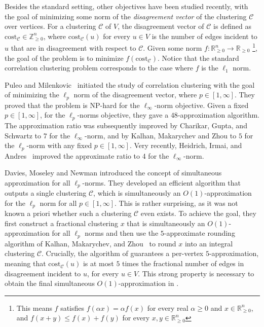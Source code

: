 \documentclass[11pt]{article}
\newcommand{\R}{\mathbb{R}}
\newcommand{\cost}{\mathrm{cost}}
\newcommand{\calC}{{\mathcal{C}}}
\begin{document}
\begin{CJK*}{UTF8}{gbsn}
Besides the standard setting, other objectives have been studied recently, with the goal of minimizing some norm of the \textit{disagreement vector} of the clustering $\calC$ over vertices. For a clustering $\mathcal{C}$ of $V$, the disagreement vector of $\calC$ is defined as $\cost_{\calC} \in \mathbb{Z}_{\ge 0}^{n}$, where $\cost_{\calC}(u)$ for every $u \in V$ is the number of edges incident to $u$ that are in disagreement with respect to $\mathcal{C}$. Given some norm $f:\R_{\geq 0}^n \to \R_{\geq 0}$ \footnote{This means $f$ satisfies $f(\alpha x) = \alpha f(x)$ for every real $\alpha \geq 0$ and $x \in \R_{\geq 0}^n$, and $f(x + y) \leq f(x) + f(y)$ for every $x, y \in \R_{\geq 0}^n$}, the goal of the problem is to minimize $f(\cost_{\calC})$. Notice that the standard correlation clustering problem corresponds to the case where $f$ is the $\ell_1$ norm.


Puleo and Milenkovic~\cite{puleo2016correlation} initiated the study of correlation clustering with the goal of minimizing the $\ell_p$ norm of the disagreement vector, where $p \in [1, \infty]$. They proved that the problem is NP-hard for the $\ell_\infty$-norm objective. Given a fixed $p \in [1, \infty]$, for the $\ell_p$-norms objective, they gave a $48$-approximation algorithm. The approximation ratio was subsequently improved by Charikar, Gupta, and Schwartz \cite{charikar2017local} to $7$ for the $\ell_\infty$-norm, and by Kalhan, Makarychev and Zhou \cite{kalhan2019correlation} to $5$ for the $\ell_p$-norm with any fixed $p \in [1, \infty]$. Very recently, Heidrich, Irmai, and Andres~\cite{heidrich20244} improved the approximate ratio to 4 for the $\ell_\infty$-norm.

Davies, Moseley and Newman \cite{davies2023one} introduced the concept of simultaneous approximation for all $\ell_p$-norms. They developed an efficient algorithm that outputs a single clustering $\calC$, which is simultaneously an $O(1)$-approximation for the $\ell_p$ norm for all $p \in [1, \infty]$. This is rather surprising, as it was not known a priori whether such a clustering $\calC$ even exists. To achieve the goal, they first construct a fractional clustering $x$ that is simultaneously an $O(1)$-approximation for all $\ell_p$ norms and then use the $5$-approximate rounding algorithm of Kalhan, Makarychev, and Zhou~\cite{kalhan2019correlation} to round $x$ into an integral clustering $\calC$.  Crucially, the algorithm of \cite{kalhan2019correlation}  guarantees a per-vertex $5$-approximation, meaning that $\cost_\calC(u)$ is at most $5$ times the fractional number of edges in disagreement incident to $u$, for every $u \in V$.  This strong property is necessary to obtain the final simultaneous $O(1)$-approximation in \cite{davies2023one}.





\end{CJK*}
\end{document}
